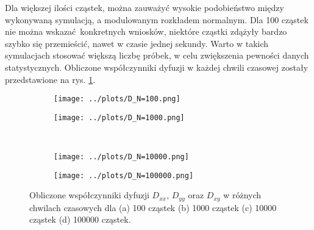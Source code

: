 \documentclass[a4paper, 12pt]{article}
\begin{document}
	\noaka Dla większej ilości cząstek, można zauważyć wysokie podobieństwo między wykonywaną symulacją, a modulowanym rozkładem normalnym. 
	Dla 100 cząstek nie można wskazać konkretnych wniosków, niektóre cząstki zdążyły bardzo szybko się przemieścić, nawet w czasie jednej sekundy.
	Warto w takich symulacjach stosować większą liczbę próbek, w celu zwiększenia pewności danych statystycznych.
	Obliczone współczynniki dyfuzji w każdej chwili czasowej zostały przedstawione na rys. \ref{diff_coefs}.
	\begin{figure}[H]
	\centering
	\begin{subfigure}{0.49\textwidth}
		\centering
		\texttt{[image: ../plots/D\_N=100.png]}
		\caption{}
	\end{subfigure}
	\begin{subfigure}{0.49\textwidth}
		\centering
		\texttt{[image: ../plots/D\_N=1000.png]}
		\caption{}
	\end{subfigure}
	\\
	\begin{subfigure}{0.49\textwidth}
		\centering
		\texttt{[image: ../plots/D\_N=10000.png]}
		\caption{}
	\end{subfigure}
	\begin{subfigure}{0.49\textwidth}
		\centering
		\texttt{[image: ../plots/D\_N=100000.png]}
		\caption{}
	\end{subfigure}
	\caption{Obliczone współczynniki dyfuzji $D_{xx}$, $D_{yy}$ oraz $D_{xy}$ w różnych chwilach czasowych dla (a) 100 cząstek (b) 1000 cząstek (c) 10000 cząstek (d) 100000 cząstek.}
	\label{diff_coefs}
\end{figure}
\end{document}

